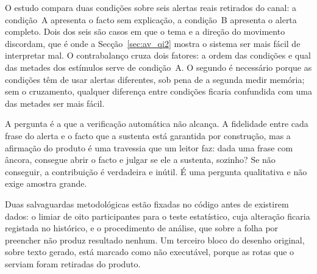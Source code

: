 O estudo compara duas condições sobre seis alertas reais retirados do canal: a condição~A apresenta
o facto sem explicação, a condição~B apresenta o alerta completo. Dois dos seis são casos em que o
tema e a direção do movimento discordam, que é onde a Secção~\ref{sec:av_qi2} mostra o sistema ser
mais fácil de interpretar mal. O contrabalanço cruza dois fatores: a ordem das condições e qual das
metades dos estímulos serve de condição~A. O segundo é necessário porque as condições têm de usar
alertas diferentes, sob pena de a segunda medir memória; sem o cruzamento, qualquer diferença entre
condições ficaria confundida com uma das metades ser mais fácil.

A pergunta é a que a verificação automática não alcança. A fidelidade entre cada frase do alerta e
o facto que a sustenta está garantida por construção, mas a afirmação do produto é uma travessia
que um leitor faz: dada uma frase com âncora, consegue abrir o facto e julgar se ele a sustenta,
sozinho? Se não conseguir, a contribuição é verdadeira e inútil. É uma pergunta qualitativa e não
exige amostra grande.

Duas salvaguardas metodológicas estão fixadas no código antes de existirem dados: o limiar de oito
participantes para o teste estatístico, cuja alteração ficaria registada no histórico, e o
procedimento de análise, que sobre a folha por preencher não produz resultado nenhum. Um terceiro
bloco do desenho original, sobre texto gerado, está marcado como não executável, porque as rotas
que o serviam foram retiradas do produto.
